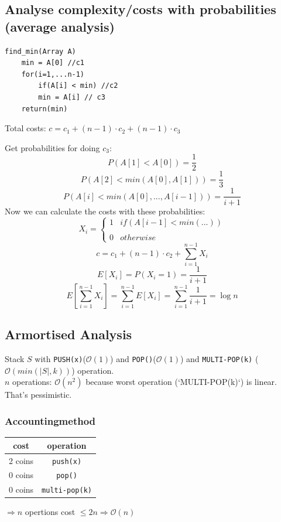 \subsection{Analyse complexity/costs with probabilities (average analysis)}

\begin{verbatim}
find_min(Array A)
    min = A[0] //c1
    for(i=1,...n-1)
        if(A[i] < min) //c2
        min = A[i] // c3
    return(min)
\end{verbatim}
Total costs: $c = c_1 + (n-1) \cdot c_2 + (n-1) \cdot c_3$ 

Get probabilities for doing $c_3$: 
$$P(A[1] < A[0]) = \frac{1}{2}$$
$$P(A[2] < min(A[0],A[1])) = \frac{1}{3}$$
$$P(A[i] < min(A[0],...,A[i-1])) = \frac{1}{i+1}$$
Now we can calculate the costs with these probabilities: 
$$X_i = \begin{cases}1 & if(A[i-1]< min(...)) \\\\ 0 & otherwise \end{cases}$$
$$c = c_1 + (n-1) \cdot c_2 + \sum_{i=1}^{n-1}X_i$$
$$E[X_i] = P(X_i = 1) = \frac{1}{i+1}$$
$$E\left[\sum_{i=1}^{n-1}X_i\right] = \sum_{i=1}^{n-1}E[X_i] = \sum_{i=1}^{n-1}\frac{1}{i+1} = \log n$$

\subsection{Armortised Analysis}
Stack $S$ with \texttt{PUSH(x)}($\mathcal{O}(1)$) and \texttt{POP()}($\mathcal{O}(1)$) and \texttt{MULTI-POP(k)} ($\mathcal{O}(min(|S|,k))$) operation. \\
$n$ operations: $\mathcal{O}(n^2)$ because worst operation (`MULTI-POP(k)`) is linear. That's pessimistic. \\
\subsubsection{Accountingmethod}
\begin{tabular}{|c|c|}\hline
	cost & operation \\ \hline
	2 coins & \texttt{push(x)} \\
	0 coins & \texttt{pop()} \\
	0 coins & \texttt{multi-pop(k)} \\ \hline 
\end{tabular} 

$\Rightarrow n$ opertions cost $\leq 2n \Rightarrow \mathcal{O}(n)$

